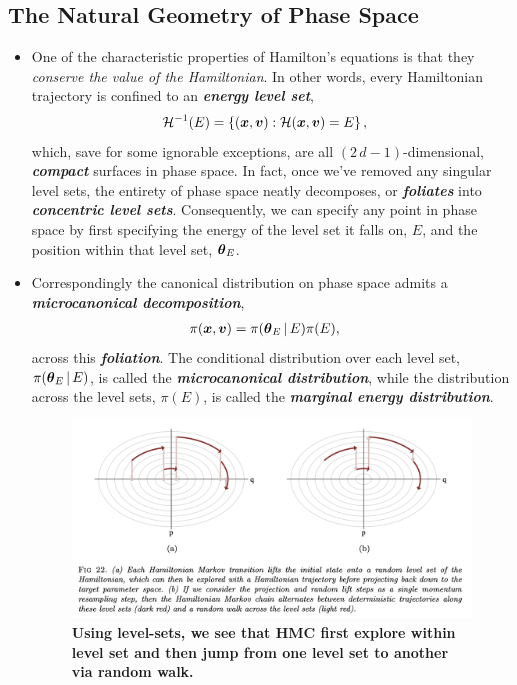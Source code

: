 \documentclass[11pt]{article}
\begin{document}
\subsection{The Natural Geometry of Phase Space}
\begin{itemize}
\item One of the characteristic properties of Hamilton’s equations is that they \emph{conserve the value of the Hamiltonian}. In other words, every Hamiltonian trajectory is confined to an \emph{\textbf{energy level set}},
\begin{align*}
{\mathcal H}^{-1}(E) &= \left\{(\boldsymbol{x}, \boldsymbol{v}): {\mathcal H}(\boldsymbol{x}, \boldsymbol{v}) = E\right\},
\end{align*} which, save for some ignorable exceptions, are all $(2\,d - 1)$-dimensional, \emph{\textbf{compact}} surfaces in phase space. In fact, once we’ve removed any singular level sets, the entirety of phase space neatly decomposes, or \emph{\textbf{foliates}} into \emph{\textbf{concentric level sets}}. Consequently, we can specify any point in phase space by first specifying the energy of the level set it falls on, $E$, and the position within that level set, $\boldsymbol{\theta}_{E}$. 

\item Correspondingly the canonical distribution on phase space admits a \emph{\textbf{microcanonical decomposition}},
\begin{align*}
\pi(\boldsymbol{x}, \boldsymbol{v}) &= \pi(\boldsymbol{\theta}_{E}\,|\,E)\pi(E),
\end{align*} across this \emph{\textbf{foliation}}. The conditional distribution over each level set, $\pi(\boldsymbol{\theta}_{E}\,|\,E)$, is called the \emph{\textbf{microcanonical distribution}}, while the distribution across the level sets, $\pi(E)$, is called the \emph{\textbf{marginal energy distribution}}.

\begin{figure}
\begin{minipage}[t]{1\linewidth}
  \centering
  \centerline{\includegraphics[scale = 0.5]{hmc_geomotry_process.png}}
\end{minipage}
\caption{\footnotesize{\textbf{Using level-sets, we see that HMC first explore within level set and then jump from one level set to another via random walk. \citep{betancourt2017conceptual}}}}
\label{fig: hmc_geomotry_process}
\end{figure}


\end{itemize}
\end{document}
